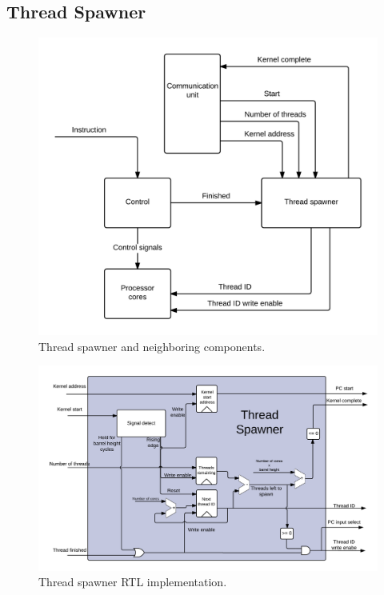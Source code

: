\subsection{Thread Spawner}

\begin{figure}[H]
	\centering
	\includegraphics[width=1.1\textwidth]{../gpu/diagrams/thread_spawner_overview.png}
	\caption{Thread spawner and neighboring components.}
	\label{fig:thread_spawner_overview}
\end{figure}
\begin{figure}[H]
	\centering
	\includegraphics[width=1.1\textwidth]{../gpu/diagrams/thread_spawner.png}
	\caption{Thread spawner RTL implementation.}
	\label{fig:thread_spawner_rtl}
\end{figure}

